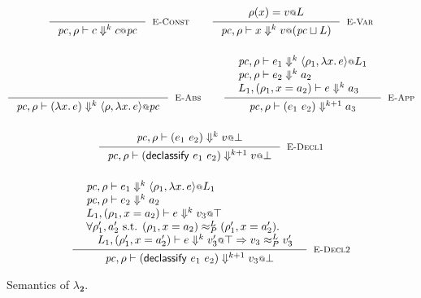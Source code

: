 \documentclass{article}
\makeatletter
\newcommand{\at}{\ensuremath{{\scriptstyle{@}}}}
\newcommand{\pc}{\ensuremath{{\mathit{pc}}}}
\theoremstyle{definition}
\makeatother
\begin{document}
\begin{figure}[ht]
  \centering
  \begin{gather*}
    \inference{}{
      \pc, \rho |- c \Downarrow^{k} c \at \pc
    }[\textsc{E-Const}]
    \qquad
    \inference{
      {\begin{array}{l}
          \rho(x) = v \at L
        \end{array}}
    }{
      \pc, \rho |- x \Downarrow^{k} v \at (\pc \sqcup L)
    }[\textsc{E-Var}]
    \\[3ex]
    \inference{}{
      \pc, \rho |- (\lambda{x}.\, e) \Downarrow^{k}
      \langle{\rho, \lambda{x}.\, e\rangle} \at \pc
    }[\textsc{E-Abs}]
    \qquad
    \inference{
      {\begin{array}{l}
          \pc, \rho |- e_1 \Downarrow^{k}
          \langle{\rho_1, \lambda{x}.\, e\rangle} \at L_1
          \\
          \pc, \rho |- e_2 \Downarrow^{k} a_2
          \\
          L_1, (\rho_1, x = a_2) |- e \Downarrow^{k} a_3
        \end{array}}
    }{
      \pc, \rho |- (e_1\ e_2) \Downarrow^{k+1} a_3
    }[\textsc{E-App}]
    \\[3ex]
    \inference{
      {\begin{array}{l}
          \pc, \rho |- (e_1\ e_2) \Downarrow^{k} v \at \bot
        \end{array}}
    }{
      \pc, \rho |- (\mathsf{declassify}\ e_1\ e_2) \Downarrow^{k+1}
      v \at \bot
    }[\textsc{E-Decl1}]
    \\[3ex]
    \inference{
      {\begin{array}{l}
          \pc, \rho |- e_1 \Downarrow^{k}
          \langle{\rho_1, \lambda{x}.\, e\rangle} \at L_1
          \\
          \pc, \rho |- e_2 \Downarrow^{k} a_2
          \\
          L_1, (\rho_1, x = a_2) |- e \Downarrow^{k} v_3 \at \top
          \\
          \forall{\rho_1', a_2' \text{ s.t. }
            (\rho_1, x = a_2) \approx^{L}_{P} (\rho_1', x = a_2')}.
          \\\quad
          L_1, (\rho_1', x = a_2') |- e \Downarrow^{k} v_3' \at \top =>
          v_3 \approx^{L}_{P} v_3'
        \end{array}}
    }{
      \pc, \rho |- (\mathsf{declassify}\ e_1\ e_2) \Downarrow^{k+1}
      v_3 \at \bot
    }[\textsc{E-Decl2}]
  \end{gather*}
  \caption{Semantics of $\lambda_{\mathbf{2}}$.}
  \label{fig:semantics}
\end{figure}
\end{document}
